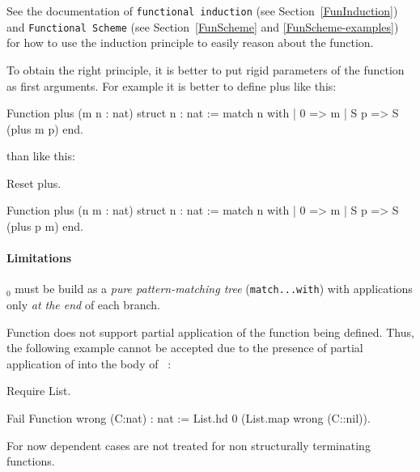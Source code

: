 See the documentation of {\tt functional induction}
(see Section~\ref{FunInduction}) and {\tt Functional Scheme}
(see Section~\ref{FunScheme} and \ref{FunScheme-examples}) for how to use the
induction principle to easily reason about the function.

 To obtain the right principle, it is better
to put rigid parameters of the function as first arguments. For
example it is better to define plus like this:

\begin{coq_example*}
Function plus (m n : nat) {struct n} : nat :=
  match n with
  | 0 => m
  | S p => S (plus m p)
  end.
\end{coq_example*}
\noindent than like this:
\begin{coq_eval}
Reset plus.
\end{coq_eval}
\begin{coq_example*}
Function plus (n m : nat) {struct n} : nat :=
  match n with
  | 0 => m
  | S p => S (plus p m)
  end.
\end{coq_example*}

\paragraph[Limitations]{Limitations\label{sec:Function-limitations}}
\term$_0$ must be build as a \emph{pure pattern-matching tree}
(\texttt{match...with}) with applications only \emph{at the end} of
each branch.  

Function does not support partial application of the function being defined. Thus, the following example cannot be accepted due to the presence of partial application of  into the body of ~:
\begin{coq_eval}
Require List.
\end{coq_eval}
\begin{coq_example*}
Fail Function wrong (C:nat) : nat :=
  List.hd 0 (List.map wrong (C::nil)).
\end{coq_example*}

For now dependent cases are not treated for non structurally terminating functions.



